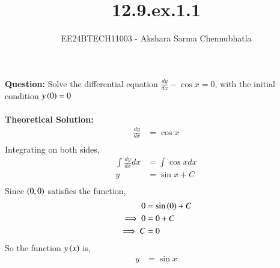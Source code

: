 \documentclass[journal]{IEEEtran}
\begin{document}

\vspace{3cm}

\title{12.9.ex.1.1}
\author{EE24BTECH11003 - Akshara Sarma Chennubhatla}
{\let\newpage\relax\maketitle}
\textbf{Question:}
Solve the differential equation $\frac{dy}{dx} - \cos x = 0$, with the initial condition $y\left(0\right) = 0$\\

\solution\\
\textbf{Theoretical Solution:}\\

\begin{align}
	\frac{dy}{dx} &= \cos x\\
\end{align}
Integrating on both sides,
\begin{align}
	\int{\frac{dy}{dx}} dx &= \int{\cos x} dx\\
	y &= \sin x + C\\
\end{align}
Since $\left(0, 0\right)$ satisfies the function,
\begin{align}
	0 &= \sin\left(0\right) + C\\
	\implies 0 &= 0 + C\\
	\implies C &= 0\\
\end{align}
So the function $y\left(x\right)$ is,
\begin{align}
	y &= \sin x\\
\end{align}
\end{document}
